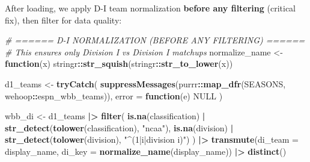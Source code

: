 \documentclass[
]{article}
\newenvironment{Shaded}{\begin{snugshade}}{\end{snugshade}}
\newcommand{\AttributeTok}[1]{\textcolor[rgb]{0.13,0.29,0.53}{#1}}
\newcommand{\CommentTok}[1]{\textcolor[rgb]{0.56,0.35,0.01}{\textit{#1}}}
\newcommand{\ConstantTok}[1]{\textcolor[rgb]{0.56,0.35,0.01}{#1}}
\newcommand{\ControlFlowTok}[1]{\textcolor[rgb]{0.13,0.29,0.53}{\textbf{#1}}}
\newcommand{\FunctionTok}[1]{\textcolor[rgb]{0.13,0.29,0.53}{\textbf{#1}}}
\newcommand{\NormalTok}[1]{#1}
\newcommand{\OtherTok}[1]{\textcolor[rgb]{0.56,0.35,0.01}{#1}}
\newcommand{\SpecialCharTok}[1]{\textcolor[rgb]{0.81,0.36,0.00}{\textbf{#1}}}
\newcommand{\StringTok}[1]{\textcolor[rgb]{0.31,0.60,0.02}{#1}}
\begin{document}
After loading, we apply D-I team normalization \textbf{before any
filtering} (critical fix), then filter for data quality:

\begin{Shaded}
\begin{Highlighting}[]
\CommentTok{\# ====== D{-}I NORMALIZATION (BEFORE ANY FILTERING) ======}
\CommentTok{\# This ensures only Division I vs Division I matchups}
\NormalTok{normalize\_name }\OtherTok{\textless{}{-}} \ControlFlowTok{function}\NormalTok{(x) stringr}\SpecialCharTok{::}\FunctionTok{str\_squish}\NormalTok{(stringr}\SpecialCharTok{::}\FunctionTok{str\_to\_lower}\NormalTok{(x))}

\NormalTok{d1\_teams }\OtherTok{\textless{}{-}} \FunctionTok{tryCatch}\NormalTok{(}
    \FunctionTok{suppressMessages}\NormalTok{(purrr}\SpecialCharTok{::}\FunctionTok{map\_dfr}\NormalTok{(SEASONS, wehoop}\SpecialCharTok{::}\NormalTok{espn\_wbb\_teams)),}
    \AttributeTok{error =} \ControlFlowTok{function}\NormalTok{(e) }\ConstantTok{NULL}
\NormalTok{)}

\NormalTok{wbb\_di }\OtherTok{\textless{}{-}}\NormalTok{ d1\_teams }\SpecialCharTok{|\textgreater{}}
    \FunctionTok{filter}\NormalTok{(}
        \FunctionTok{is.na}\NormalTok{(classification) }\SpecialCharTok{|} \FunctionTok{str\_detect}\NormalTok{(}\FunctionTok{tolower}\NormalTok{(classification), }\StringTok{"ncaa"}\NormalTok{),}
        \FunctionTok{is.na}\NormalTok{(division) }\SpecialCharTok{|} \FunctionTok{str\_detect}\NormalTok{(}\FunctionTok{tolower}\NormalTok{(division), }\StringTok{"\^{}(1|i|division i)"}\NormalTok{)}
\NormalTok{    ) }\SpecialCharTok{|\textgreater{}}
    \FunctionTok{transmute}\NormalTok{(}\AttributeTok{di\_team =}\NormalTok{ display\_name, }\AttributeTok{di\_key =} \FunctionTok{normalize\_name}\NormalTok{(display\_name)) }\SpecialCharTok{|\textgreater{}}
    \FunctionTok{distinct}\NormalTok{()}


\end{Highlighting}
\end{Shaded}
\end{document}
